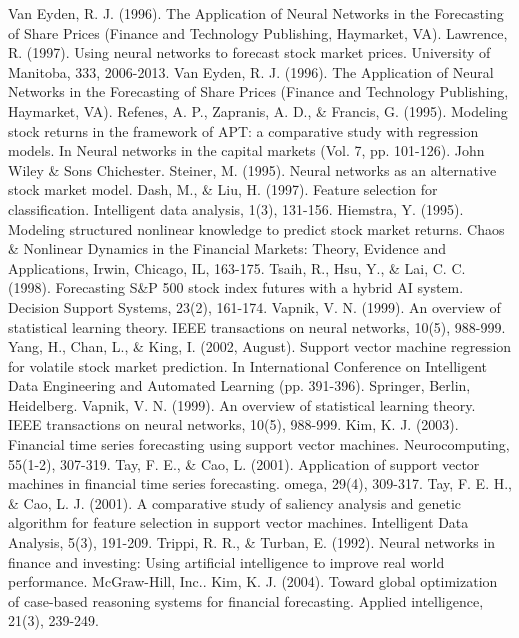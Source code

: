 \documentclass[a4paper,12pt]{report}
\begin{document}
\begin{thebibliography}{9}
	Van Eyden, R. J. (1996). The Application of Neural Networks in the Forecasting of Share Prices (Finance and Technology Publishing, Haymarket, VA).
	Lawrence, R. (1997). Using neural networks to forecast stock market prices. University of Manitoba, 333, 2006-2013.
	Van Eyden, R. J. (1996). The Application of Neural Networks in the Forecasting of Share Prices (Finance and Technology Publishing, Haymarket, VA).
	Refenes, A. P., Zapranis, A. D., \& Francis, G. (1995). Modeling stock returns in the framework of APT: a comparative study with regression models. In Neural networks in the capital markets (Vol. 7, pp. 101-126). John Wiley \& Sons Chichester.
	Steiner, M. (1995). Neural networks as an alternative stock market model.
	Dash, M., \& Liu, H. (1997). Feature selection for classification. Intelligent data analysis, 1(3), 131-156.
	Hiemstra, Y. (1995). Modeling structured nonlinear knowledge to predict stock market returns. Chaos \& Nonlinear Dynamics in the Financial Markets: Theory, Evidence and Applications, Irwin, Chicago, IL, 163-175.
	Tsaih, R., Hsu, Y., \& Lai, C. C. (1998). Forecasting S\&P 500 stock index futures with a hybrid AI system. Decision Support Systems, 23(2), 161-174.
	Vapnik, V. N. (1999). An overview of statistical learning theory. IEEE transactions on neural networks, 10(5), 988-999.
	Yang, H., Chan, L., \& King, I. (2002, August). Support vector machine regression for volatile stock market prediction. In International Conference on Intelligent Data Engineering and Automated Learning (pp. 391-396). Springer, Berlin, Heidelberg.
	Vapnik, V. N. (1999). An overview of statistical learning theory. IEEE transactions on neural networks, 10(5), 988-999.
	Kim, K. J. (2003). Financial time series forecasting using support vector machines. Neurocomputing, 55(1-2), 307-319.
	Tay, F. E., \& Cao, L. (2001). Application of support vector machines in financial time series forecasting. omega, 29(4), 309-317.
	Tay, F. E. H., \& Cao, L. J. (2001). A comparative study of saliency analysis and genetic algorithm for feature selection in support vector machines. Intelligent Data Analysis, 5(3), 191-209.
	Trippi, R. R., \& Turban, E. (1992). Neural networks in finance and investing: Using artificial intelligence to improve real world performance. McGraw-Hill, Inc..
	Kim, K. J. (2004). Toward global optimization of case-based reasoning systems for financial forecasting. Applied intelligence, 21(3), 239-249.

\end{thebibliography}
\end{document}
